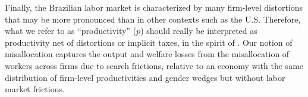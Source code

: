 Finally, the Brazilian labor market is characterized by many firm-level distortions \citep{Dix-CarneiroGoldbergMeghirUlyssea2024} that may be more pronounced than in other contexts such as the U.S. Therefore, what we refer to as ``productivity'' ($p$) should really be interpreted as productivity net of distortions or implicit taxes, in the spirit of \citet{RestucciaRogerson2008}. Our notion of misallocation captures the output and welfare losses from the misallocation of workers across firms due to search frictions, relative to an economy with the same distribution of firm-level productivities and gender wedges but without labor market frictions.